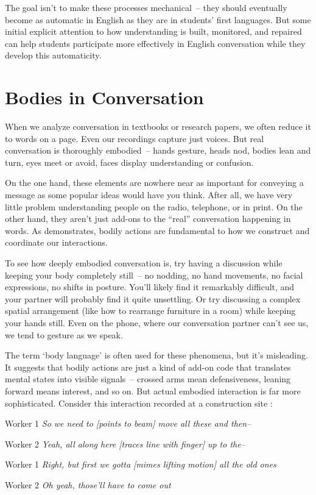 The goal isn't to make these processes mechanical~-- they should eventually become as automatic in English as they are in students' first languages. But some initial explicit attention to how understanding is built, monitored, and repaired can help students participate more effectively in English conversation while they develop this automaticity.

\section{Bodies in Conversation} \label{sec:bodies}

When we analyze conversation in textbooks or research papers, we often reduce it to words on a page. Even our recordings capture just voices. But real conversation is thoroughly embodied~-- hands gesture, heads nod, bodies lean and turn, eyes meet or avoid, faces display understanding or confusion.

On the one hand, these elements are nowhere near as important for conveying a message as some popular ideas would have you think. After all, we have very little problem understanding people on the radio, telephone, or in print. On the other hand, they aren't just add-ons to the ``real'' conversation happening in words. As \citet{goodwin2000} demonstrates, bodily actions are fundamental to how we construct and coordinate our interactions.

To see how deeply embodied conversation is, try having a discussion while keeping your body completely still~-- no nodding, no hand movements, no facial expressions, no shifts in posture. You'll likely find it remarkably difficult, and your partner will probably find it quite unsettling. Or try discussing a complex spatial arrangement (like how to rearrange furniture in a room) while keeping your hands still. Even on the phone, where our conversation partner can't see us, we tend to gesture as we speak.

The term `body language' is often used for these phenomena, but it's misleading. It suggests that bodily actions are just a kind of add-on code that translates mental states into visible signals~-- crossed arms mean defensiveness, leaning forward means interest, and so on. But actual embodied interaction is far more sophisticated. Consider this interaction recorded at a construction site \citep{needed}:

\begin{dialogue}
\item[Worker 1] \textit{So we need to [points to beam] move all these and then--} 
\item[Worker 2] \textit{Yeah, all along here [traces line with finger] up to the--}
\item[Worker 1] \textit{Right, but first we gotta [mimes lifting motion] all the old ones}
\item[Worker 2] \textit{Oh yeah, those'll have to come out}
\end{dialogue}

